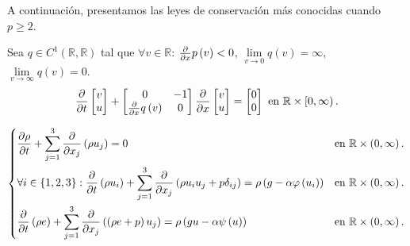 A continuación, presentamos las leyes de conservación más conocidas
cuando $p\geq 2$.

\begin{example}
	Sea $q\in C^{1}\left(\mathbb{R},\mathbb{R}\right)$ tal que
	$\forall v\in\mathbb{R}$: $\diffp{}{x}p\left(v\right)<0$,
	$\lim\limits_{v\to0}q\left(v\right)=\infty$,
	$\lim\limits_{v\to\infty}q\left(v\right)=0$.
	\begin{equation*}
		\diffp*{
			\begin{bmatrix}
				v \\
				u
			\end{bmatrix}
		}{t}+
		\begin{bmatrix}
			0                          & -1 \\
			\diffp{}{x}q\left(v\right) & 0
		\end{bmatrix}
		\diffp*{
			\begin{bmatrix}
				v \\
				u
			\end{bmatrix}
		}{x}=
		\begin{bmatrix}
			0 \\
			0
		\end{bmatrix}
		\text{ en }\mathbb{R}\times\left[0,\infty\right).
	\end{equation*}
\end{example}

\begin{example}
	\begin{equation*}
		\begin{dcases}
			\diffp{\rho}{t}+
			\sum_{j=1}^{3}
			\diffp{}{x_{j}}
			\left(\rho u_{j}\right)=0                          &
			\text{en }\mathbb{R}\times\left(0,\infty\right).     \\
			\forall i\in\left\{1,2,3\right\}:
			\diffp{}{t}
			\left(\rho u_{i}\right)+
			\sum_{j=1}^{3}
			\diffp{}{x_{j}}
			\left(\rho u_{i}u_{j}+p\delta_{ij}\right)=
			\rho\left(g-\alpha\varphi\left(u_{i}\right)\right) &
			\text{en }\mathbb{R}\times\left(0,\infty\right).     \\
			\diffp{}{t}
			\left(\rho e\right)+
			\sum_{j=1}^{3}
			\diffp{}{x_{j}}
			\left(\left(\rho e+p\right)u_{j}\right)=
			\rho\left(gu-\alpha\psi\left(u\right)\right)       &
			\text{en }\mathbb{R}\times\left(0,\infty\right).
		\end{dcases}
	\end{equation*}
\end{example}

